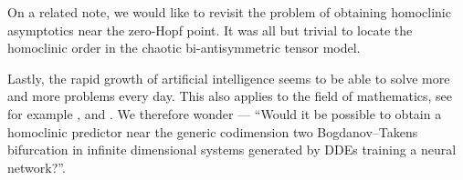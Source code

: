On a related note, we would like to revisit the problem of obtaining homoclinic
asymptotics near the zero-Hopf point. It was all but trivial to locate the
homoclinic order in the chaotic bi-antisymmetric tensor model.

Lastly, the rapid growth of artificial intelligence seems to be able to solve
more and more problems every day. This also applies to the field of mathematics,
see for example \cite{Davies2021}, and \cite{631606893d774be2a2c919789d14b2d6}.
We therefore wonder --- ``Would it be possible to obtain a homoclinic predictor
near the generic codimension two Bogdanov--Takens bifurcation in infinite
dimensional systems generated by DDEs training a neural network?''.
